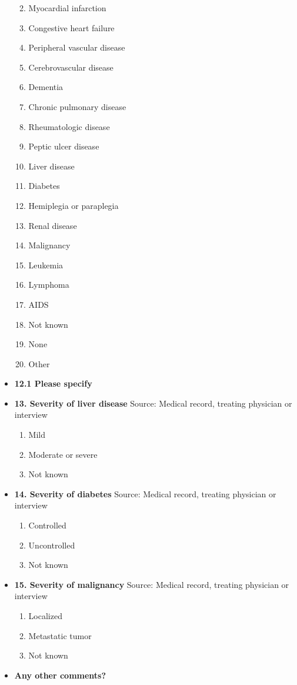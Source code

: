 \documentclass[
]{scrartcl}
\providecommand{\tightlist}{%
  \setlength{\itemsep}{0pt}\setlength{\parskip}{0pt}}\usepackage{longtable,booktabs,array}
\begin{document}
\begin{itemize}
  \begin{enumerate}
  \def\labelenumi{\arabic{enumi}.}
  \tightlist
  \item
    Myocardial infarction
  \item
    Congestive heart failure
  \item
    Peripheral vascular disease
  \item
    Cerebrovascular disease
  \item
    Dementia
  \item
    Chronic pulmonary disease
  \item
    Rheumatologic disease
  \item
    Peptic ulcer disease
  \item
    Liver disease
  \item
    Diabetes
  \item
    Hemiplegia or paraplegia
  \item
    Renal disease
  \item
    Malignancy
  \item
    Leukemia
  \item
    Lymphoma
  \item
    AIDS
  \item
    Not known
  \item
    None
  \item
    Other
  \end{enumerate}
\item
  \textbf{12.1 Please specify}
\item
  \textbf{13. Severity of liver disease} Source: Medical record,
  treating physician or interview

  \begin{enumerate}
  \def\labelenumi{\arabic{enumi}.}
  \tightlist
  \item
    Mild
  \item
    Moderate or severe
  \item
    Not known
  \end{enumerate}
\item
  \textbf{14. Severity of diabetes} Source: Medical record, treating
  physician or interview

  \begin{enumerate}
  \def\labelenumi{\arabic{enumi}.}
  \tightlist
  \item
    Controlled
  \item
    Uncontrolled
  \item
    Not known
  \end{enumerate}
\item
  \textbf{15. Severity of malignancy} Source: Medical record, treating
  physician or interview

  \begin{enumerate}
  \def\labelenumi{\arabic{enumi}.}
  \tightlist
  \item
    Localized
  \item
    Metastatic tumor
  \item
    Not known
  \end{enumerate}
\item
  \textbf{Any other comments?}
\end{itemize}
\end{document}
